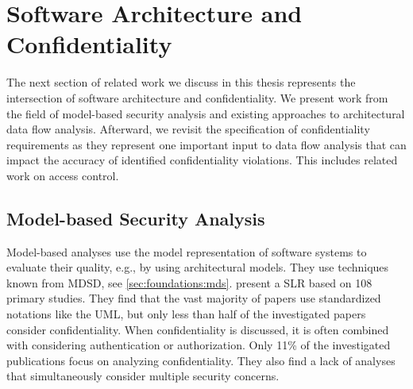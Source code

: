 




\section{Software Architecture and Confidentiality}%
\label{sec:relatedwork:architectureXconfidentiality}

The next section of related work we discuss in this thesis represents the intersection of software architecture and confidentiality.
We present work from the field of model-based security analysis and existing approaches to architectural data flow analysis.
Afterward, we revisit the specification of confidentiality requirements as they represent one important input to data flow analysis that can impact the accuracy of identified confidentiality violations.
This includes related work on access control.


\subsection{Model-based Security Analysis}

Model-based analyses use the model representation of software systems to evaluate their quality, e.g., by using architectural models.
They use techniques known from \acf{MDSD}, see \autoref{sec:foundations:mds}.
\textcite{nguyen_extensive_2015} present a \ac{SLR} based on 108 primary studies.
They find that the vast majority of papers use standardized notations like the \ac{UML}, but only less than half of the investigated papers consider confidentiality.
When confidentiality is discussed, it is often combined with considering authentication or authorization.
Only 11\% of the investigated publications focus on analyzing confidentiality.
They also find a lack of analyses that simultaneously consider multiple security concerns.


